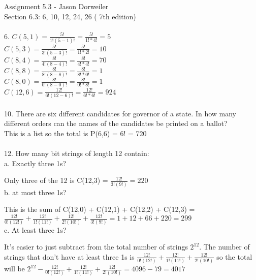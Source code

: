 \documentclass{article}
\begin{document}
Assignment 5.3 - Jason Dorweiler\\

Section 6.3: 6, 10, 12, 24, 26 ( 7th edition)\\

\hrulefill\\

6. $C(5,1) = \frac{5!}{1!(5-1)!} = \frac{5!}{1!*4!} = 5$\\

$C(5,3) = \frac{5!}{3!(5-3)!} = \frac{5!}{1!*2!} = 10$\\

$C(8,4) = \frac{8!}{4!(8-4)!} = \frac{8!}{4!*4!} = 70$\\

$C(8,8) = \frac{8!}{8!(8-8)!} = \frac{8!}{8!*0!} = 1$\\

$C(8,0) = \frac{8!}{0!(8-0)!} = \frac{8!}{0!*8!} = 1$\\

$C(12,6) = \frac{12!}{6!(12-6)!} = \frac{12!}{6!*6!} = 924$\\

\hrulefill\\

10. There are six different candidates for governor of a state. In how many different orders
can the names of the candidates be printed on a ballot?\\

This is a list so the total is P(6,6) = 6! = 720\\

\hrulefill\\

12. How many bit strings of length 12 contain:\\

a. Exactly three 1s?

Only three of the 12 is C(12,3) = $\frac{12!}{3!(9!)} = 220$\\

b. at most three 1s?

This is the sum of C(12,0) + C(12,1) + C(12,2) + C(12,3) = $\frac{12!}{0!(12!)}+\frac{12!}{1!(11!)}+\frac{12!}{2!(10!)}+\frac{12!}{3!(9!)} = 1 + 12 + 66 + 220 = 299$\\

c. At least three 1s?

It's easier to just subtract from the total number of strings $2^{12}$.  The number of strings that don't have at least three 1s is $\frac{12!}{0!(12!)}+\frac{12!}{1!(11!)}+\frac{12!}{2!(10!)}$ so the total will be $2^{12} - \frac{12!}{0!(12!)}+\frac{12!}{1!(11!)}+\frac{12!}{2!(10!)} = 4096 - 79 = 4017$\\
\end{document}
